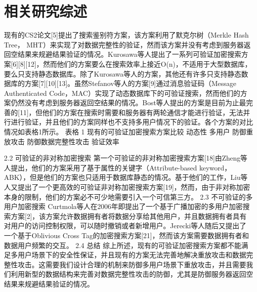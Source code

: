 \chapter{相关研究综述}
\label{cha:related}
现有的CS2论文[5]提出了搜索鉴别符方案，该方案利用了默克尔树（Merkle Hash Tree， MHT）来实现了对数据完整性的验证，然而该方案并没有考虑到服务器返回空结果来规避结果验证的情况。Kurosawa等人提出了一系列可验证加密搜索方案[6][8][12]，然而他们的方案要么在搜索效率上接近O(n)，不适用于大型数据库，要么只支持静态数据库。除了Kurosawa等人的方案，其他还有许多只支持静态数据库的方案[7][10][13]。虽然Stefanov等人的方案[9]通过消息验证码（Message Authenticated Code，MAC）实现了动态数据库下的可验证搜索，然而他们的方案仍然没有考虑到服务器返回空结果的情况。Bost等人提出的方案是目前为止最完善的[11]，但他们的方案在搜索时需要和服务器有两轮通信才能进行验证，无法并行进行验证，并且他们的方案同样也不支持多用户情况下的验证。各个方案的对比情况如表格1所示。
表格 1 现有的可验证加密搜索方案比较
	动态性	多用户	防御重放攻击	防御数据完整性攻击	验证效率


2.2 可验证的非对称加密搜索
第一个可验证的非对称加密搜索方案[18]由Zheng等人提出，他们的方案采用了基于属性的关键字（Attribute-based keyword，ABK），但是他们的方案也只适用于数据库静态的情况。基于他们的工作，Liu等人又提出了一个更高效的可验证非对称加密搜索方案[19]，然而，由于非对称加密本身的限制，他们的方案必不可少地需要引入一个可信第三方。
2.3 不可验证的多用户加密搜索
	Curtmola等人在2006年即提出了一个基于广播加密的多用户加密搜索方案[2]，该方案允许数据拥有者将数据分享给其他用户，并且数据拥有者具有对用户的访问控制权限，可以随时撤销或者新增用户。Jerecki等人随后又提出了一个基于Oblivious Cross Tag的加密搜索方案[21]，然而该方案需要数据拥有者和数据用户频繁的交互。
2.4 总结
	综上所述，现有的可验证加密搜索方案都不能满足多用户场景下的安全性保证，并且现有的方案无法完善地解决重放攻击和数据完整性攻击。这需要我们设计合理的机制来防御多用户场景下重放攻击，并且需要我们利用新型的数据结构来完善对数据完整性攻击的防御，尤其是防御服务器返回空结果来规避结果验证的情况。


